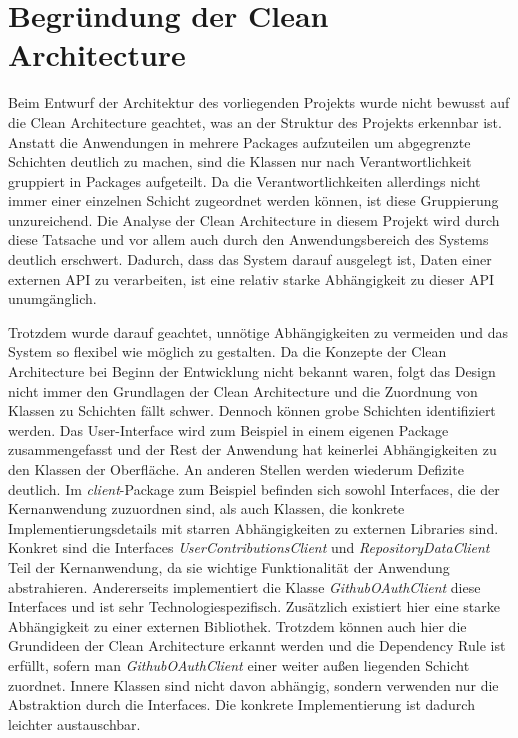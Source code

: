 \section{Begründung der Clean Architecture}
Beim Entwurf der Architektur des vorliegenden Projekts wurde nicht bewusst auf die Clean Architecture geachtet, was an der Struktur des Projekts erkennbar ist.
Anstatt die Anwendungen in mehrere Packages aufzuteilen um abgegrenzte Schichten deutlich zu machen, sind die Klassen nur nach Verantwortlichkeit gruppiert in Packages aufgeteilt.
Da die Verantwortlichkeiten allerdings nicht immer einer einzelnen Schicht zugeordnet werden können, ist diese Gruppierung unzureichend.
Die Analyse der Clean Architecture in diesem Projekt wird durch diese Tatsache und vor allem auch durch den Anwendungsbereich des Systems deutlich erschwert.
Dadurch, dass das System darauf ausgelegt ist, Daten einer externen API zu verarbeiten, ist eine relativ starke Abhängigkeit zu dieser API unumgänglich.

Trotzdem wurde darauf geachtet, unnötige Abhängigkeiten zu vermeiden und das System so flexibel wie möglich zu gestalten.
Da die Konzepte der Clean Architecture bei Beginn der Entwicklung nicht bekannt waren, folgt das Design nicht immer den Grundlagen der Clean Architecture und die Zuordnung von Klassen zu Schichten fällt schwer.
Dennoch können grobe Schichten identifiziert werden.
Das User-Interface wird zum Beispiel in einem eigenen Package zusammengefasst und der Rest der Anwendung hat keinerlei Abhängigkeiten zu den Klassen der Oberfläche.
An anderen Stellen werden wiederum Defizite deutlich.
Im \textit{client}-Package zum Beispiel befinden sich sowohl Interfaces, die der Kernanwendung zuzuordnen sind, als auch Klassen, die konkrete Implementierungsdetails mit starren Abhängigkeiten zu externen Libraries sind.
Konkret sind die Interfaces \textit{UserContributionsClient} und \textit{RepositoryDataClient} Teil der Kernanwendung, da sie wichtige Funktionalität der Anwendung abstrahieren.
Andererseits implementiert die Klasse \textit{GithubOAuthClient} diese Interfaces und ist sehr Technologiespezifisch. 
Zusätzlich existiert hier eine starke Abhängigkeit zu einer externen Bibliothek.
Trotzdem können auch hier die Grundideen der Clean Architecture erkannt werden und die Dependency Rule ist erfüllt, sofern man \textit{GithubOAuthClient} einer weiter außen liegenden Schicht zuordnet.
Innere Klassen sind nicht davon abhängig, sondern verwenden nur die Abstraktion durch die Interfaces. 
Die konkrete Implementierung ist dadurch leichter austauschbar.

